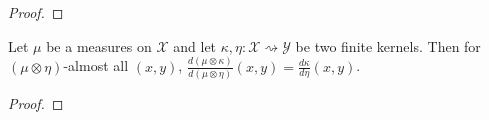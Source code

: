 \begin{proof} \leanok
{}
\end{proof}

\begin{corollary}
  \label{cor:rnDeriv_compProd_right}
  \leanok
  Let $\mu$ be a measures on $\mathcal X$ and let $\kappa, \eta : \mathcal X \rightsquigarrow \mathcal Y$ be two finite kernels. Then for $(\mu \otimes \eta)$-almost all $(x, y)$, $\frac{d (\mu \otimes \kappa)}{d (\mu \otimes \eta)}(x,y) = \frac{d \kappa}{d \eta}(x,y)$.
\end{corollary}

\begin{proof} \leanok
{}
\end{proof}